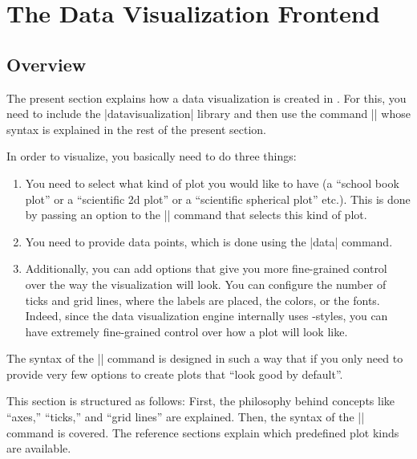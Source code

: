 %
%
%


\section{The Data Visualization Frontend}
\label{section-dv-main}
\label{section-dv-main-setup}

\subsection{Overview}

The present section explains how a data visualization is created in
\tikzname. For this, you need to include the |datavisualization|
library and then use the command |\datavisualization| whose syntax is
explained in the rest of the present section.

In order to visualize, you basically need to do three things:
\begin{enumerate}
\item You need to select what kind of plot you would like to have (a
  ``school book plot'' or a ``scientific 2d plot'' or a ``scientific
  spherical plot'' etc.). This is done by passing an option to the
  |\datavisualization| command that selects this kind of plot.
\item You need to provide data points, which is done using the |data|
  command.
\item Additionally, you can add options that give you more
  fine-grained control over the way the visualization will look. You
  can configure the number of ticks and grid lines, where the labels
  are placed, the colors, or the fonts. Indeed, since the
  data visualization engine internally uses \tikzname-styles, you can
  have extremely fine-grained control over how a plot will look like. 
\end{enumerate}

The syntax of the |\datavisualization| command is designed in such a
way that if you only need to provide very few options to create plots
that ``look good by default''. 

This section is structured as follows: First, the philosophy behind
concepts like ``axes,'' ``ticks,'' and ``grid lines'' are
explained. Then, the syntax of the |\datavisualization| command is
covered. The reference sections explain which predefined plot kinds
are available.


